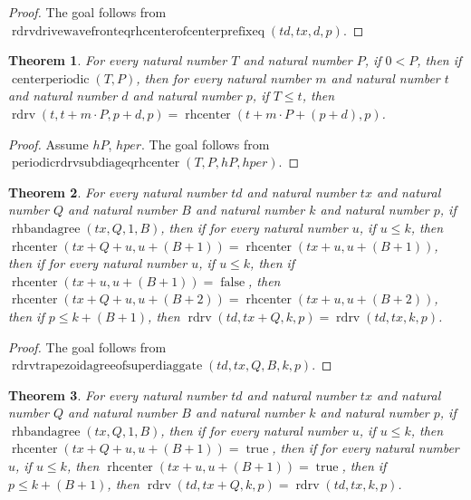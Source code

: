 \documentclass[11pt]{article}
\newtheorem{theorem}{Theorem}[section]
\theoremstyle{definition}
\begin{document}
\begin{proof}
The goal follows from \(\operatorname{rdrvdrivewavefronteqrhcenterofcenterprefixeq}(td, tx, d, p)\).
\end{proof}
\begin{theorem}
\label{ll:paper:periodic-rdrv-subdiag-eq-rhcenter}
For every natural number \(T\) and natural number \(P\), if \(0 < P\), then if \(\operatorname{centerperiodic}(T, P)\), then for every natural number \(m\) and natural number \(t\) and natural number \(d\) and natural number \(p\), if \(T \le t\), then \(\operatorname{rdrv}(t, t + m \cdot P, p + d, p) = \operatorname{rhcenter}(t + m \cdot P + (p + d), p)\).
\end{theorem}
\begin{proof}
Assume \(hP\), \(hper\).
The goal follows from \(\operatorname{periodicrdrvsubdiageqrhcenter}(T, P, hP, hper)\).
\end{proof}
\begin{theorem}
\label{ll:paper:rdrv-trapezoid-agree-of-superdiag-gate}
For every natural number \(td\) and natural number \(tx\) and natural number \(Q\) and natural number \(B\) and natural number \(k\) and natural number \(p\), if \(\operatorname{rhbandagree}(tx, Q, 1, B)\), then if for every natural number \(u\), if \(u \le k\), then \(\operatorname{rhcenter}(tx + Q + u, u + (B + 1)) = \operatorname{rhcenter}(tx + u, u + (B + 1))\), then if for every natural number \(u\), if \(u \le k\), then if \(\operatorname{rhcenter}(tx + u, u + (B + 1)) = \operatorname{false}\), then \(\operatorname{rhcenter}(tx + Q + u, u + (B + 2)) = \operatorname{rhcenter}(tx + u, u + (B + 2))\), then if \(p \le k + (B + 1)\), then \(\operatorname{rdrv}(td, tx + Q, k, p) = \operatorname{rdrv}(td, tx, k, p)\).
\end{theorem}
\begin{proof}
The goal follows from \(\operatorname{rdrvtrapezoidagreeofsuperdiaggate}(td, tx, Q, B, k, p)\).
\end{proof}
\begin{theorem}
\label{ll:paper:rdrv-trapezoid-agree-of-black-superdiag}
For every natural number \(td\) and natural number \(tx\) and natural number \(Q\) and natural number \(B\) and natural number \(k\) and natural number \(p\), if \(\operatorname{rhbandagree}(tx, Q, 1, B)\), then if for every natural number \(u\), if \(u \le k\), then \(\operatorname{rhcenter}(tx + Q + u, u + (B + 1)) = \operatorname{true}\), then if for every natural number \(u\), if \(u \le k\), then \(\operatorname{rhcenter}(tx + u, u + (B + 1)) = \operatorname{true}\), then if \(p \le k + (B + 1)\), then \(\operatorname{rdrv}(td, tx + Q, k, p) = \operatorname{rdrv}(td, tx, k, p)\).
\end{theorem}
\end{document}
